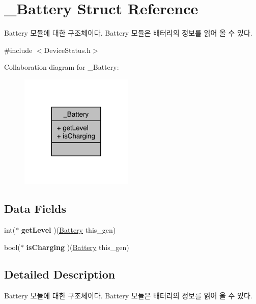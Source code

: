 \hypertarget{struct__Battery}{\section{\-\_\-\-Battery Struct Reference}
\label{struct__Battery}
}


Battery 모듈에 대한 구조체이다. Battery 모듈은 배터리의 정보를 읽어 올 수 있다.  




{\ttfamily \#include $<$Device\-Status.\-h$>$}



Collaboration diagram for \-\_\-\-Battery\-:\nopagebreak
\begin{figure}[H]
\begin{center}
\leavevmode
\includegraphics[width=152pt]{d3/d5f/struct__Battery__coll__graph}
\end{center}
\end{figure}
\subsection*{Data Fields}
\begin{DoxyCompactItemize}
\item 
\hypertarget{struct__Battery_a6321988705fe01fbbd13ed44645920ce}{int($\ast$ {\bfseries get\-Level} )(\hyperlink{struct__Battery}{Battery} this\-\_\-gen)}\label{struct__Battery_a6321988705fe01fbbd13ed44645920ce}

\item 
\hypertarget{struct__Battery_a58bd0a8a8a168cad5a323b2cef48f161}{bool($\ast$ {\bfseries is\-Charging} )(\hyperlink{struct__Battery}{Battery} this\-\_\-gen)}\label{struct__Battery_a58bd0a8a8a168cad5a323b2cef48f161}

\end{DoxyCompactItemize}


\subsection{Detailed Description}
Battery 모듈에 대한 구조체이다. Battery 모듈은 배터리의 정보를 읽어 올 수 있다. 


